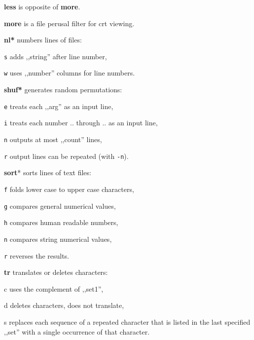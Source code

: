 \begin{enumx}
	\item [\cmd] \textbf{less} is opposite of \textbf{more}.
	\item [\cmd] \textbf{more} is a file perusal filter for crt viewing.
\end{enumx}

\begin{enumx}
	\item [\cmd] \textbf{nl*} numbers lines of files:
	\item [\texttt{s}] adds ,,string'' after line number,
	\item [\texttt{w}] uses ,,number'' columns for line numbers.
\end{enumx}

\begin{enumx}
	\item [\cmd] \textbf{shuf*} generates random permutations:
	\item [\texttt{e}] treats each ,,arg'' as an input line,
	\item [\texttt{i}] treats each number .. through .. as an input line, 
	\item [\texttt{n}] outputs at most ,,count'' lines,
	\item [\texttt{r}] output lines can be repeated (with \texttt{-n}).
\end{enumx}

\begin{enumx}
	\item [\cmd] \textbf{sort}* sorts lines of text files:
	\item [\texttt{f}] folds lower case to upper case characters,
	\item [\texttt{g}] compares general numerical values,
	\item [\texttt{h}] compares human readable numbers,
	\item [\texttt{n}] compares string numerical values,
	\item [\texttt{r}] reverses the results.
\end{enumx}

\begin{enumx}
	\item [\cmd] \textbf{tr} translates or deletes characters:
	\item [c] uses the complement of ,,set1'',
	\item [d] deletes characters, does not translate,
	\item [s] replaces each sequence of a repeated character that is listed 
	in the last specified ,,set'' with a single occurrence of that character.
\end{enumx}

